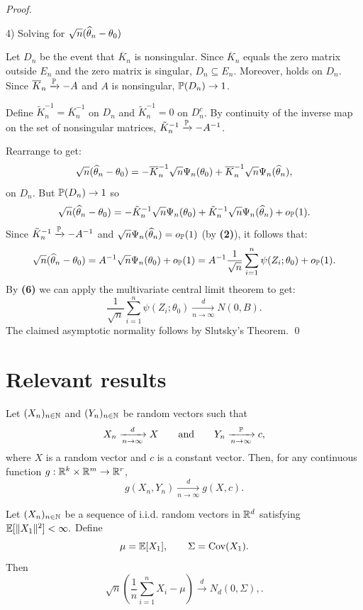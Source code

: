 \begin{proof}
  \begin{description}
    \item[4) Solving for $\sqrt{n}(\what{\theta}_n - \theta_0)$] 
  \end{description}
  Let $D_n$ be the event that $\overline{K}_n$ is nonsingular. Since $\overline{K}_n$ equals the
  zero matrix outside $E_n$ and the zero matrix is singular, $D_n \subseteq  E_n$. Moreover,
   holds on $D_n$. Since $\overline{K}_n \xrightarrow[]{\P} -A$ and $A$
  is nonsingular, $\P(D_n) \to 1$. 

  Define $\tilde{K}_n^{-1}= \overline{K}^{-1}_n$ on $D_n$ and $\tilde{K}_n^{-1} = 0$ on $D_n^{c}$.
  By continuity of the inverse map on the set of nonsingular matrices, $\tilde{K}_n^{-1}
  \xrightarrow[]{\P} -A^{-1}$.

  Rearrange  to get:
  \[ 
  \sqrt{n}(\what{\theta}_n - \theta_0) =
  -\overline{K}_n^{-1}\sqrt{n}\Psi_n(\theta_0) 
  + \overline{K}^{-1}_n \sqrt{n}\Psi_n(\what{\theta}_n)
  ,\]
  on $D_n$. But $\P(D_n) \to 1$ so
  \[ 
  \sqrt{n}(\what{\theta}_n - \theta_0) =
  -\tilde{K}_n^{-1}\sqrt{n}\Psi_n(\theta_0) 
  + \tilde{K}^{-1}_n \sqrt{n}\Psi_n(\what{\theta}_n) + o_{\P}(1)
  .\]
  Since $\tilde{K}_n^{-1} \xrightarrow[]{\P} -A^{-1}$ and $\sqrt{n}\Psi_n(\what{\theta}_n) =
  o_{\P}(1)$ (by \textbf{(2)}), it follows that:
  \[ 
  \sqrt{n}(\what{\theta}_n - \theta_0) = A^{-1}\sqrt{n}\Psi_n(\theta_0) + o_{\P}(1)
  = A^{-1}\frac{1}{\sqrt{n}} \sum_{i=1}^{n} \psi(Z_i;\theta_0)+ o_{\P}(1)
  .\]
  By \textbf{(6)} we can apply the multivariate central limit theorem to get:
  \[ 
    \frac{1}{\sqrt{n}} \sum_{i=1}^{n} \psi(Z_i;\theta_0) \xrightarrow[n \to \infty ]{d} N(0, B)
  .\]
  The claimed asymptotic normality follows by Slutsky's Theorem.
  \qed
\end{proof}



\section{Relevant results}
\begin{theorem*}
Let $(X_n)_{n\in\N}$ and $(Y_n)_{n\in\N}$ be random vectors such that
\[
  X_n \xrightarrow[n\to \infty ]{d} X
\qquad \text{and} \qquad
Y_n \xrightarrow[n\to \infty ]{\P} c,
\]
where $X$ is a random vector and $c$ is a constant vector. Then, for any continuous function
$g:\R^{k}\times\R^{m}\to\R^{r}$,
\[
  g(X_n,Y_n)\xrightarrow[n\to \infty ]{d}g(X,c).
\]
\end{theorem*}
\begin{theorem*}
Let $(X_n)_{n\in\N}$ be a sequence of i.i.d. random vectors in $\R^d$ satisfying $\E[\|X_1\|^2]<\infty.$ Define
\[
\mu=\E[X_1],
\qquad
\Sigma=\operatorname{Cov}(X_1).
\]
Then
\[
\sqrt{n}\left(\frac{1}{n}\sum_{i=1}^n X_i-\mu\right)
\xrightarrow{d} N_d(0,\Sigma),
.\]
\end{theorem*}

